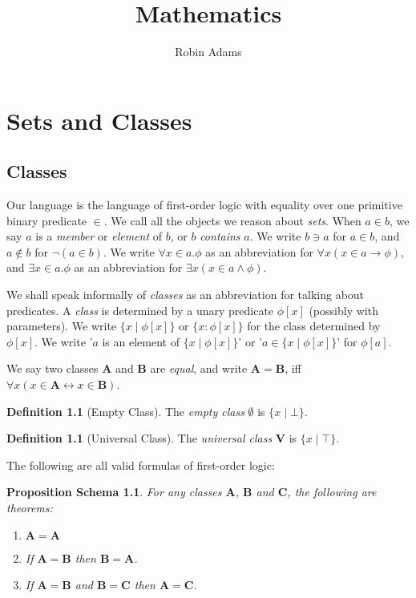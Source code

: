 \documentclass{book}
\title{Mathematics}
\author{Robin Adams}
\newtheorem{props}[ax]{Proposition Schema}
\theoremstyle{definition}
\newtheorem{df}[ax]{Definition}
\begin{document}
\maketitle

\chapter{Sets and Classes}

\section{Classes}

Our language is the language of first-order logic with equality over one primitive binary predicate $\in$. We call all the objects we reason about \emph{sets}. When $a \in b$, we say $a$ is a \emph{member} or \emph{element} of $b$, or $b$ \emph{contains} $a$. We write $b \ni a$ for $a \in b$, and $a \notin b$ for $\neg(a \in b)$. We write $\forall x \in a. \phi$ as an abbreviation for $\forall x(x \in a \rightarrow \phi)$, and $\exists x \in a. \phi$ as an abbreviation for $\exists x(x \in a \wedge \phi)$.

We shall speak informally of \emph{classes} as an abbreviation for talking about predicates. A \emph{class} is determined by a unary predicate $\phi[x]$ (possibly with parameters). We write $\{ x \mid \phi[x] \}$ or $\{ x : \phi[x] \}$ for the class determined by $\phi[x]$. We write '$a$ is an element of $\{x \mid \phi[x]\}$' or '$a \in \{x \mid \phi[x]\}$' for $\phi[a]$.

We say two classes $\mathbf{A}$ and $\mathbf{B}$ are \emph{equal}, and write $\mathbf{A} = \mathbf{B}$, iff $\forall x (x \in \mathbf{A} \leftrightarrow x \in \mathbf{B})$.

\begin{df}[Empty Class]
The \emph{empty class} $\emptyset$ is $\{ x \mid \bot\}$.
\end{df}

\begin{df}[Universal Class]
The \emph{universal class} $\mathbf{V}$ is $\{ x \mid \top \}$.
\end{df}

The following are all valid formulas of first-order logic:

\begin{props}
For any classes $\mathbf{A}$, $\mathbf{B}$ and $\mathbf{C}$, the following are theorems:
\begin{enumerate}
\item $\mathbf{A} = \mathbf{A}$
\item If $\mathbf{A} = \mathbf{B}$ then $\mathbf{B} = \mathbf{A}$.
\item If $\mathbf{A} = \mathbf{B}$ and $\mathbf{B} = \mathbf{C}$ then $\mathbf{A} = \mathbf{C}$.
\end{enumerate}
\end{props}
\end{document}
